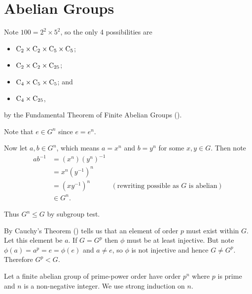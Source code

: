 \section{Abelian Groups}
\begin{questions}
    \item Note $100 = 2^2 \times 5^2$, so the only 4 possibilities are
    \begin{itemize}
        \item $\mathrm{C}_{2} \times \mathrm{C}_{2} \times \mathrm{C}_{5} \times \mathrm{C}_{5}$;
        \item $\mathrm{C}_{2} \times \mathrm{C}_{2} \times \mathrm{C}_{25}$;
        \item $\mathrm{C}_{4} \times \mathrm{C}_{5} \times \mathrm{C}_{5}$; and
        \item $\mathrm{C}_{4} \times \mathrm{C}_{25}$,
    \end{itemize}
    by the Fundamental Theorem of Finite Abelian Groups ().

    \item \begin{partquestions}{\roman*}
        \item Note that $e \in G^n$ since $e = e^n$.
    
        Now let $a, b \in G^n$, which means $a = x^n$ and $b = y^n$ for some $x, y \in G$. Then note
        \begin{align*}
            ab^{-1} &= (x^n)(y^n)^{-1}\\
            &= x^n(y^{-1})^n\\
            &= (xy^{-1})^n & (\text{rewriting possible as }G \text{ is abelian})\\
            &\in G^n.
        \end{align*}
    
        Thus $G^n \leq G$ by subgroup test.

        \item By Cauchy's Theorem () tells us that an element of order $p$ must exist within $G$. Let this element be $a$. If $G = G^p$ then $\phi$ must be at least injective. But note $\phi(a) = a^p = e = \phi(e)$ and $a \neq e$, so $\phi$ is not injective and hence $G \neq G^p$. Therefore $G^p < G$.
    \end{partquestions}

    \item Let a finite abelian group of prime-power order have order $p^n$ where $p$ is prime and $n$ is a non-negative integer. We use strong induction on $n$.
    

\end{questions}
